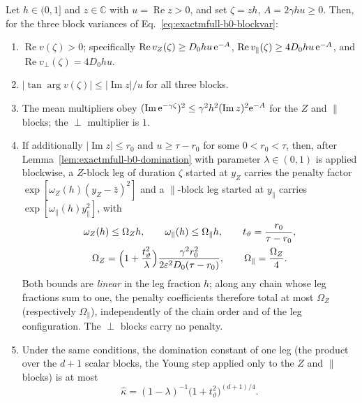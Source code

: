 \begin{lemma}
\label{lem:exactmfull-b0-legs}
Let \(h\in(0,1]\) and \(z\in\mathbb C\) with \(u=\operatorname{Re}z>0\), and
set \(\zeta=zh\), \(A=2\gamma hu\ge0\).  Then, for the three block variances
of Eq.~\eqref{eq:exactmfull-b0-blockvar}:
\begin{enumerate}
\item[(a)] \(\operatorname{Re}v(\zeta)>0\); specifically
\(\operatorname{Re}v_Z(\zeta)\ge D_0hu\,\mathrm e^{-A}\),
\(\operatorname{Re}v_\parallel(\zeta)\ge4D_0hu\,\mathrm e^{-A}\), and
\(\operatorname{Re}v_\perp(\zeta)=4D_0hu\).
\item[(b)] \(|\tan\arg v(\zeta)|\le|\operatorname{Im}z|/u\) for all three
blocks.
\item[(c)] The mean multipliers obey
\((\operatorname{Im}\mathrm e^{-\gamma\zeta})^2
\le\gamma^2h^2(\operatorname{Im}z)^2\mathrm e^{-A}\) for the \(Z\) and
\(\parallel\) blocks; the \(\perp\) multiplier is \(1\).
\item[(d)] If additionally \(|\operatorname{Im}z|\le r_0\) and
\(u\ge\tau-r_0\) for some \(0<r_0<\tau\), then, after
Lemma~\ref{lem:exactmfull-b0-domination} with parameter
\(\lambda\in(0,1)\) is applied blockwise, a \(Z\)-block leg of duration
\(\zeta\) started at \(y_Z\) carries the penalty factor
\(\exp[\omega_Z(h)(y_Z-\bar z)^2]\) and a \(\parallel\)-block leg started at
\(y_\parallel\) carries \(\exp[\omega_\parallel(h)y_\parallel^2]\), with
\begin{equation}
 \begin{gathered}
 \omega_Z(h)\le\Omega_Zh,
 \qquad
 \omega_\parallel(h)\le\Omega_\parallel h,
 \qquad
 t_\vartheta=\frac{r_0}{\tau-r_0},\\
 \Omega_Z
 =\Bigl(1+\frac{t_\vartheta^2}{\lambda}\Bigr)
  \frac{\gamma^2r_0^2}{2\varepsilon^2D_0(\tau-r_0)},
 \qquad
 \Omega_\parallel=\frac{\Omega_Z}{4}.
 \end{gathered}
 \label{eq:exactmfull-b0-budget}
\end{equation}
Both bounds are \emph{linear} in the leg fraction \(h\); along any chain
whose leg fractions sum to one, the penalty coefficients therefore total at
most \(\Omega_Z\) (respectively \(\Omega_\parallel\)), independently of the
chain order and of the leg configuration.  The \(\perp\) blocks carry no
penalty.
\item[(e)] Under the same conditions, the domination constant of one leg
(the product over the \(d+1\) scalar blocks, the Young step applied only to
the \(Z\) and \(\parallel\) blocks) is at most
\begin{equation}
 \hat\kappa
 =(1-\lambda)^{-1}\bigl(1+t_\vartheta^2\bigr)^{(d+1)/4}.
 \label{eq:exactmfull-b0-kappahat}
\end{equation}
\end{enumerate}
\end{lemma}

